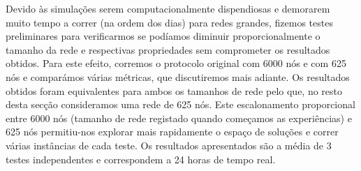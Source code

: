





Devido às simulações serem computacionalmente dispendiosas e demorarem muito tempo a correr (na ordem dos dias) para redes grandes, fizemos testes preliminares para verificarmos se podíamos diminuir proporcionalmente o tamanho da rede e respectivas propriedades sem comprometer os resultados obtidos.
Para este efeito, corremos o protocolo original com 6000 nós e com 625 nós e comparámos várias métricas, que discutiremos mais adiante.
Os resultados obtidos foram equivalentes para ambos os tamanhos de rede pelo que, no resto desta secção consideramos uma rede de 625 nós.
Este escalonamento proporcional entre 6000 nós (tamanho de rede registado quando começamos as experiências) e 625 nós permitiu-nos explorar mais rapidamente o espaço de soluções e correr várias instâncias de cada teste.
Os resultados apresentados são a média de 3 testes independentes e correspondem a 24 horas de tempo real.



